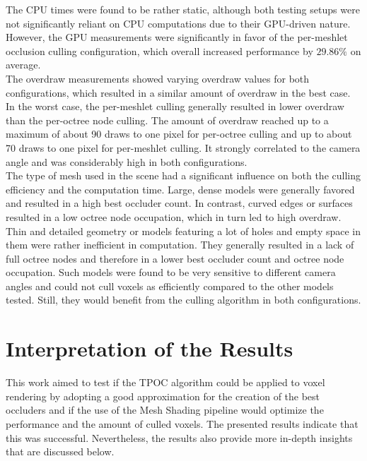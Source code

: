 \noindent
The \ac{CPU} times were found to be rather static, although both testing setups were not significantly reliant 
on \ac{CPU} computations due to their \ac{GPU}-driven nature. However, the \ac{GPU} measurements were significantly 
in favor of the per-meshlet occlusion culling configuration, which overall increased performance by $29.86\%$ on 
average. \\

\noindent
The overdraw measurements showed varying overdraw values for both configurations, which resulted in a similar amount 
of overdraw in the best case. In the worst case, the per-meshlet culling generally resulted in lower overdraw than 
the per-octree node culling. The amount of overdraw reached up to a maximum of about 90 draws to one pixel for 
per-octree culling and up to about 70 draws to one pixel for per-meshlet culling. It strongly correlated to the 
camera angle and was considerably high in both configurations. \\ 

\noindent
The type of mesh used in the scene had a significant influence on both the culling efficiency and the computation time.
Large, dense models were generally favored and resulted in a high best occluder count. In contrast, curved edges or 
surfaces resulted in a low octree node occupation, which in turn led to high overdraw. Thin and detailed geometry or 
models featuring a lot of holes and empty space in them were rather inefficient in computation. They generally resulted 
in a lack of full octree nodes and therefore in a lower best occluder count and octree node occupation. Such models 
were found to be very sensitive to different camera angles and could not cull voxels as efficiently compared to the 
other models tested. Still, they would benefit from the culling algorithm in both configurations.

\section{Interpretation of the Results}

This work aimed to test if the \ac{TPOC} algorithm could be applied to voxel rendering by adopting a good approximation 
for the creation of the best occluders and if the use of the Mesh Shading pipeline would optimize the performance and 
the amount of culled voxels. The presented results indicate that this was successful. Nevertheless, the results also 
provide more in-depth insights that are discussed below. \\

